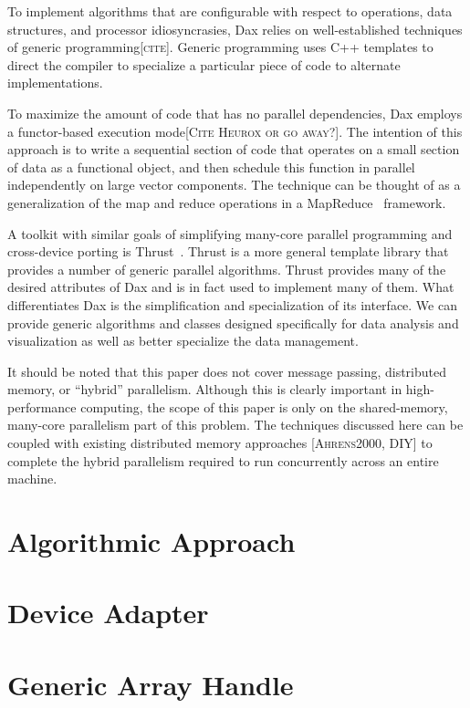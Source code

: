 \documentclass{sig-alternate}
\newcommand*{\lcite}[1]{~\cite{#1}}
\newcommand{\fix}[1]{{\color{red}\textsc{[#1]}}}
\begin{document}
\noindent
To implement algorithms that are configurable with respect to operations,
data structures, and processor idiosyncrasies, Dax relies on
well-established techniques of generic programming\fix{cite}.  Generic
programming uses C++ templates to direct the compiler to specialize a
particular piece of code to alternate implementations.

To maximize the amount of code that has no parallel dependencies, Dax
employs a functor-based execution mode\fix{Cite Heurox or go away?}.  The
intention of this approach is to write a sequential section of code that
operates on a small section of data as a functional object, and then
schedule this function in parallel independently on large vector
components.  The technique can be thought of as a generalization of the map
and reduce operations in a MapReduce\lcite{MapReduce} framework.

A toolkit with similar goals of simplifying many-core parallel programming
and cross-device porting is Thrust\lcite{Thrust}.  Thrust is a more general
template library that provides a number of generic parallel algorithms.
Thrust provides many of the desired attributes of Dax and is in fact used
to implement many of them.  What differentiates Dax is the simplification
and specialization of its interface.  We can provide generic algorithms and
classes designed specifically for data analysis and visualization as well
as better specialize the data management.

It should be noted that this paper does not cover message passing,
distributed memory, or ``hybrid'' parallelism.  Although this is clearly
important in high-performance computing, the scope of this paper is only on
the shared-memory, many-core parallelism part of this problem.  The
techniques discussed here can be coupled with existing distributed memory
approaches \fix{Ahrens2000, DIY} to complete the hybrid parallelism
required to run concurrently across an entire machine.

\section{Algorithmic Approach}

\section{Device Adapter}

\section{Generic Array Handle}



\end{document}
